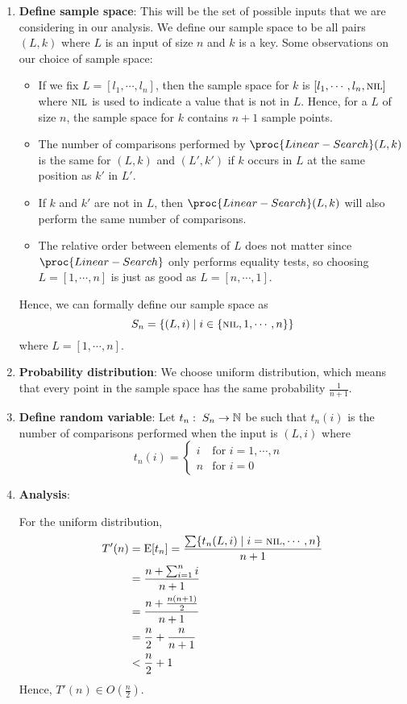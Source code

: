 \begin{enumerate}
    \item \textbf{Define sample space}: This will be the set of possible inputs that we are considering in our analysis. We define our sample space to be all pairs $(L,k)$ where $L$ is an input of size $n$ and $k$ is a key. Some observations on our choice of sample space:
    \begin{itemize}
        \item If we fix $L = [l_1, \cdots, l_n]$, then the sample space for $k$ is $[l_1,\cdots,l_n, \textsc{nil}]$ where $\textsc{nil}$ is used to indicate a value that is not in $L$. Hence, for a $L$ of size $n$, the sample space for $k$ contains $n+1$ sample points.
        \item The number of comparisons performed by $\proc{Linear-Search}(L,k)$ is the same for $(L,k)$ and $(L',k')$ if $k$ occurs in $L$ at the same position as $k'$ in $L'$.
        \item If $k$ and $k'$ are not in $L$, then $\proc{Linear-Search}(L,k)$ will also perform the same number of comparisons.
        \item The relative order between elements of $L$ does not matter since $\proc{Linear-Search}$ only performs equality tests, so choosing $L=[1,\cdots,n]$ is just as good as $L=[n,\cdots,1]$.
    \end{itemize}
    Hence, we can formally define our sample space as
    $$
    S_n = \{ (L,i) \mid i \in \{ \textsc{nil}, 1, \cdots, n \} \}
    $$
    where $L = [1,\cdots,n]$.
    \item \textbf{Probability distribution}: We choose uniform distribution, which means that every point in the sample space has the same probability $\displaystyle \frac{1}{n+1}$.
    \item \textbf{Define random variable}: Let $t_n:\; S_n \to \mathbb{N}$ be such that $t_n(i)$ is the number of comparisons performed when the input is $(L,i)$ where
    $$
    t_n(i) = \begin{cases}
        i & \text{for $i=1,\cdots,n$ } \\
        n & \text{for $i=0$ }
    \end{cases}
    $$
    \item \textbf{Analysis}:

    For the uniform distribution,
    $$
    \begin{aligned}
        T'(n) &= \mathrm{E}[t_n] = \frac{\sum \{ t_n(L,i) \mid i = \textsc{nil},\cdots,n \}}{n+1} \\
        &= \frac{n + \sum_{i=1}^n i}{n+1} \\
        &= \frac{n + \frac{n(n+1)}{2}}{n+1} \\
        &= \frac{n}{2} + \frac{n}{n+1} \\
        &< \frac{n}{2} + 1 
    \end{aligned}
    $$
    Hence, $\displaystyle T'(n) \in O(\frac{n}{2})$.
\end{enumerate}

